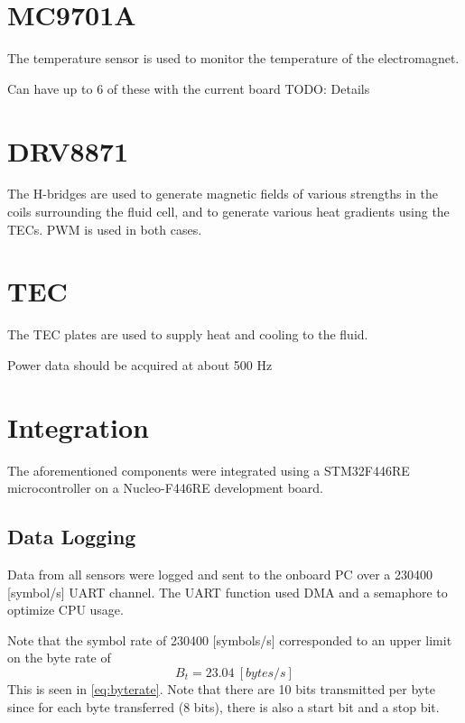 \documentclass{article}
\begin{document}
\clearpage

%
%
%
%

\section{MC9701A} \label{tempsensor}
The temperature sensor is used to monitor the temperature of the electromagnet.

Can have up to 6 of these with the current board
TODO: Details
\clearpage

%
%
%
%

\section{DRV8871} \label{hbridge}
The H-bridges are used to generate magnetic fields of various strengths in the coils surrounding the fluid cell, and to generate various heat gradients using the TECs. PWM is used in both cases.
\clearpage

%
%
%
%

\section{TEC} \label{18B20}
The TEC plates are used to supply heat and cooling to the fluid.

Power data should be acquired at about 500 Hz
\clearpage

%
%
%
%

\section{Integration} \label{integration}
The aforementioned components were integrated using a STM32F446RE microcontroller on a Nucleo-F446RE development board.

\subsection{Data Logging}
Data from all sensors were logged and sent to the onboard PC over a 230400 [symbol/s] UART channel. The UART function used DMA and a semaphore to optimize CPU usage.


Note that the symbol rate of 230400 [symbols/s] corresponded to an upper limit on the byte rate of 
$$B_t = 23.04 \ [bytes/s]$$
This is seen in \ref{eq:byterate}. Note that there are 10 bits transmitted per byte since for each byte transferred (8 bits), there is also a start bit and a stop bit.
\end{document}

